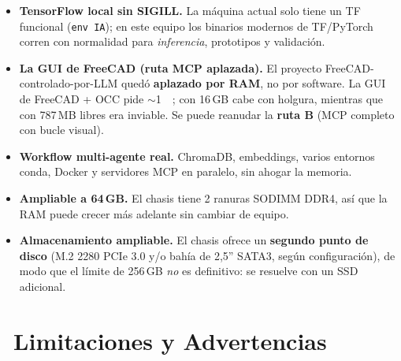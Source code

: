 \documentclass[11pt,a4paper]{article}
\newcommand{\iconotexto}[2]{\textcolor{cyanNeon}{\faIcon{#1}}~#2}
\begin{document}
\begin{tcolorbox}[cajaFortaleza, title={\faIcon{unlock}~Capacidades que se habilitan}]
\begin{itemize}
    \item \textbf{TensorFlow local sin SIGILL.} La máquina actual solo tiene un TF
    funcional (\texttt{env IA}); en este equipo los binarios modernos de TF/PyTorch
    corren con normalidad para \emph{inferencia}, prototipos y validación.
    \item \textbf{La GUI de FreeCAD (ruta MCP aplazada).} El proyecto FreeCAD-controlado-por-LLM
    quedó \textbf{aplazado por RAM}, no por software. La GUI de FreeCAD + OCC pide
    $\sim$\SI{1}{\giga\byte}; con 16\,GB cabe con holgura, mientras que con 787\,MB libres
    era inviable. Se puede reanudar la \textbf{ruta B} (MCP completo con bucle visual).
    \item \textbf{Workflow multi-agente real.} ChromaDB, embeddings, varios entornos
    conda, Docker y servidores MCP en paralelo, sin ahogar la memoria.
    \item \textbf{Ampliable a 64\,GB.} El chasis tiene 2 ranuras SODIMM DDR4, así que la
    RAM puede crecer más adelante sin cambiar de equipo.
    \item \textbf{Almacenamiento ampliable.} El chasis ofrece un \textbf{segundo punto de
    disco} (M.2 2280 PCIe 3.0 y/o bahía de 2{,}5'' SATA3, según configuración), de modo
    que el límite de 256\,GB \emph{no} es definitivo: se resuelve con un SSD adicional.
\end{itemize}
\end{tcolorbox}

\section[Limitaciones y Advertencias]{\iconotexto{exclamation-triangle}{Limitaciones y Advertencias}}
\end{document}
